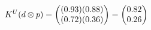 \documentclass[preview]{standalone}
\begin{document}
\begin{align*}
\special{dvisvgm:raw <g id='unique000'>}K^U(d \otimes p) = \begin{pmatrix} (0.93)(0.88) \\ (0.72)(0.36) \end{pmatrix} = \begin{pmatrix} 0.82 \\ 0.26 \end{pmatrix}\special{dvisvgm:raw </g>}
\end{align*}
\end{document}
